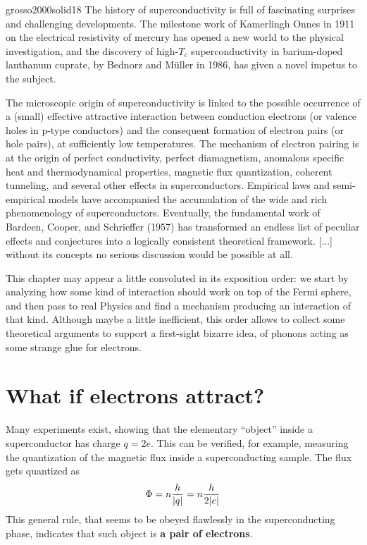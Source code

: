 \begin{cit}{grosso2000solid}{18}
	The history of superconductivity is full of fascinating surprises and challenging developments. The milestone work of Kamerlingh Onnes in 1911 on the electrical resistivity of mercury has opened a new world to the physical investigation, and the discovery of high-$T_c$ superconductivity in barium-doped lanthanum cuprate, by Bednorz and Müller in 1986, has given a novel impetus to the subject. 
	
	The microscopic origin of superconductivity is linked to the possible occurrence of a (small) effective attractive interaction between conduction electrons (or valence holes in p-type conductors) and the consequent formation of electron pairs (or hole pairs), at sufficiently low temperatures. The mechanism of electron pairing is at the origin of perfect conductivity, perfect diamagnetism, anomalous specific heat and thermodynamical properties, magnetic flux quantization, coherent tunneling, and several other effects in superconductors. Empirical laws and semi-empirical models have accompanied the accumulation of the wide and rich phenomenology of superconductors. Eventually, the fundamental work of Bardeen, Cooper, and Schrieffer (1957) has transformed an endless list of peculiar effects and conjectures into a logically consistent theoretical framework. [...] without its concepts no serious discussion would be possible at all.
\end{cit}

This chapter may appear a little convoluted in its exposition order: we start by analyzing how some kind of interaction should work on top of the Fermi sphere, and then pass to real Physics and find a mechanism producing an interaction of that kind. Although maybe a little inefficient, this order allows to collect some theoretical arguments to support a first-sight bizarre idea, of phonons acting as some strange glue for electrons.

\section{What if electrons attract?}

Many experiments exist, showing that the elementary ``object'' inside a superconductor has charge $q=2e$. This can be verified, for example, measuring the quantization of the magnetic flux inside a superconducting sample. The flux gets quantized as
\[
	\Phi = n\frac{h}{\abs{q}} = n \frac{h}{2\abs{e}} 
\]
This general rule, that seems to be obeyed flawlessly in the superconducting phase, indicates that such object is \textbf{a pair of electrons}.

